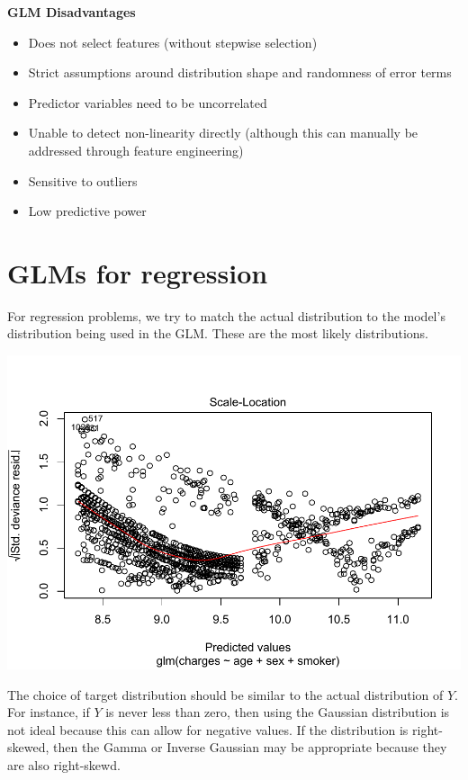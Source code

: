 \documentclass[openany]{book}
\providecommand{\tightlist}{%
  \setlength{\itemsep}{0pt}\setlength{\parskip}{0pt}}
\begin{document}
\textbf{GLM Disadvantages}

\begin{itemize}
\tightlist
\item
  Does not select features (without stepwise selection)
\item
  Strict assumptions around distribution shape and randomness of error terms
\item
  Predictor variables need to be uncorrelated
\item
  Unable to detect non-linearity directly (although this can manually be addressed through feature engineering)
\item
  Sensitive to outliers
\item
  Low predictive power
\end{itemize}

\hypertarget{glms-for-regression}{%
\section{GLMs for regression}\label{glms-for-regression}}

For regression problems, we try to match the actual distribution to the model's distribution being used in the GLM. These are the most likely distributions.

\begin{center}\includegraphics{05-linear-models_files/figure-latex/unnamed-chunk-17-1} \end{center}

The choice of target distribution should be similar to the actual distribution of \(Y\). For instance, if \(Y\) is never less than zero, then using the Gaussian distribution is not ideal because this can allow for negative values. If the distribution is right-skewed, then the Gamma or Inverse Gaussian may be appropriate because they are also right-skewd.
\end{document}

